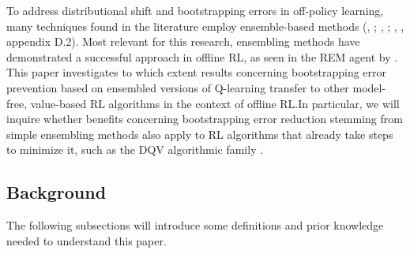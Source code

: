 To address distributional shift and bootstrapping errors in
off-policy learning, many techniques found in the literature employ
ensemble-based methods (\citeauthor{osband2016deep},
\citeyear{osband2016deep}; \citeauthor{anschel2017averaged},
\citeyear{anschel2017averaged}; \citeauthor{pmlr-v97-fujimoto19a},
\citeyear{pmlr-v97-fujimoto19a}, appendix D.2).
Most relevant for this research,
ensembling methods have demonstrated a successful approach in
offline RL, as seen in the REM agent by
\citet{agarwal2020optimistic}. This
paper investigates to which extent results concerning bootstrapping
error prevention based on ensembled versions of Q-learning transfer to
other model-free, value-based RL algorithms in the context of offline
RL.\@ In particular, we will inquire whether benefits concerning
bootstrapping error reduction stemming from simple ensembling methods
also apply to RL algorithms that already take steps to minimize it,
such as the DQV algorithmic family \citep{sabatelli2020deep}.

\subsection{Background}
The following subsections will introduce some definitions and prior
knowledge needed to understand this paper.





